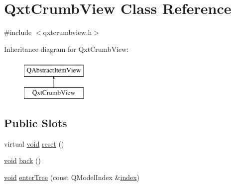 \hypertarget{class_qxt_crumb_view}{\section{Qxt\-Crumb\-View Class Reference}
\label{class_qxt_crumb_view}
}


{\ttfamily \#include $<$qxtcrumbview.\-h$>$}

Inheritance diagram for Qxt\-Crumb\-View\-:\begin{figure}[H]
\begin{center}
\leavevmode
\includegraphics[height=2.000000cm]{class_qxt_crumb_view}
\end{center}
\end{figure}
\subsection*{Public Slots}
\begin{DoxyCompactItemize}
\item 
virtual \hyperlink{group___u_a_v_objects_plugin_ga444cf2ff3f0ecbe028adce838d373f5c}{void} \hyperlink{class_qxt_crumb_view_a52675110927a0132200686af8b7ea398}{reset} ()
\item 
\hyperlink{group___u_a_v_objects_plugin_ga444cf2ff3f0ecbe028adce838d373f5c}{void} \hyperlink{class_qxt_crumb_view_a314d3eee89ca13dbbcb5e43f22537718}{back} ()
\item 
\hyperlink{group___u_a_v_objects_plugin_ga444cf2ff3f0ecbe028adce838d373f5c}{void} \hyperlink{class_qxt_crumb_view_a76805352dd4dfa7a80c7f1afb85e4b17}{enter\-Tree} (const Q\-Model\-Index \&\hyperlink{glext_8h_ab47dd9958bcadea08866b42bf358e95e}{index})
\end{DoxyCompactItemize}

